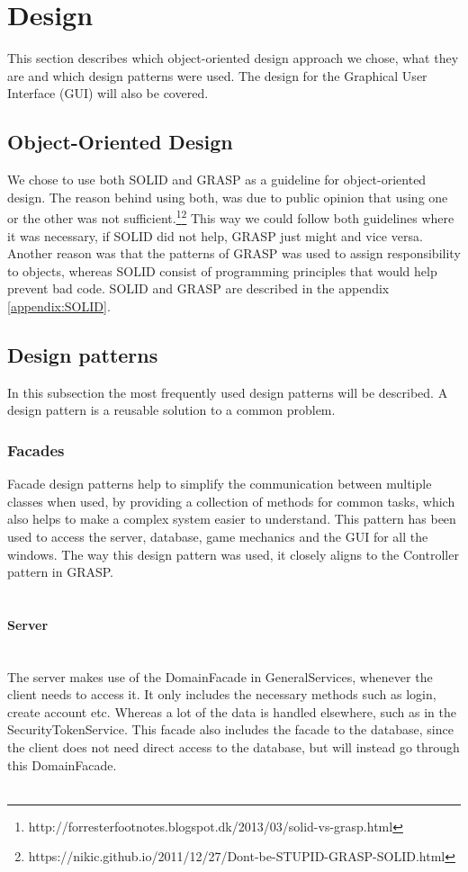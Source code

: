 
\chapter{Design}
This section describes which object-oriented design approach we chose,
 what they are and which design patterns were used. The design for the
 Graphical User Interface (GUI) will also be covered.

		\section{Object-Oriented Design}
We chose to use both SOLID and GRASP as a guideline for object-oriented
 design. The reason behind using both, was due to public opinion that using
  one or the other was not
	sufficient.\footnote{http://forresterfootnotes.blogspot.dk/2013/03/solid-vs-grasp.html}\footnote{https://nikic.github.io/2011/12/27/Dont-be-STUPID-GRASP-SOLID.html}
  This way we could follow both guidelines where it was necessary, if
  SOLID did not help, GRASP just might and vice versa. Another reason
   was that the patterns of GRASP was used to assign responsibility to
    objects, whereas SOLID consist of programming principles that would
    help prevent bad code. SOLID and GRASP are described in the appendix \ref{appendix:SOLID}.
		\section{Design patterns}
In this subsection the most frequently used design patterns will be described.
 A design pattern is a reusable solution to a common problem.
			\subsection{Facades}
Facade design patterns help to simplify the communication between multiple
classes when used, by providing a collection of methods for common tasks,
 which also helps to make a complex system easier to understand. This pattern
 has been used to access the server, database, game mechanics and the GUI for all the windows.
The way this design pattern was used, it closely aligns to the Controller pattern in GRASP.
\\
\\
\subsubsection{Server}
\\
The server makes use of the DomainFacade in GeneralServices, whenever the
client needs to access it. It only includes the necessary methods such as
login, create account etc. Whereas a lot of the data is handled elsewhere,
 such as in the SecurityTokenService. This facade also includes the facade
 to the database, since the client does not need direct access to the database,
  but will instead go through this DomainFacade.
\\
\\

